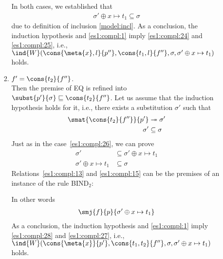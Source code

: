 \begin{enumerate}
\begin{enumerate}
\begin{enumerate}
\begin{itemize}
            \end{itemize}
            In both cases, we established that
            \begin{gather}
              \sigma' \oplus x \mapsto t_1 \subseteq
              \sigma \label{es1:compl:25}
            \end{gather}
            due to definition of inclusion \eqref{model:incl}. As a
            conclusion, the induction hypothesis and
            \eqref{es1:compl:1} imply \eqref{es1:compl:24} and
            \eqref{es1:compl:25}, i.e.,
            \(\ind{W}(\cons{\meta{x},l}{{p}''},
            \cons{t_1,l}{f''}, \sigma, \sigma' \oplus x \mapsto t_1)\)
            holds.

          \item \(f' = \cons{t_2}{f''}\).\\ Then the premise of
            \textsf{EQ} is refined into
            \(\subst{{p}'}{\sigma} \sqsubseteq
            \cons{t_2}{f''}\). Let us assume that the induction
            hypothesis holds for it, i.e., there exists a substitution
            \(\sigma'\) such that
            \begin{align}
              \smat{\cons{t_2}{f''}}{{p}'} &\twoheadrightarrow
              \sigma' \label{es1:compl:13}\\
              \sigma' &\subseteq \sigma\notag
            \end{align}
            Just as in the case~\ref{es1:compl:26}, we can prove
            \begin{align}
              \sigma' &\subseteq \sigma' \oplus x \mapsto t_1
              \label{es1:compl:15}\\
              \sigma' \oplus x \mapsto t_1 &\subseteq \sigma
              \label{es1:compl:27}
            \end{align}
            Relations~\eqref{es1:compl:13} and \eqref{es1:compl:15}
            can be the premises of an instance of the rule
            \textsf{BIND}\(_2\):
            In other words
            \begin{gather}
              \smj{f}{{p}}{\sigma' \oplus x \mapsto
                t_1} \label{es1:compl:28}
            \end{gather}
            As a conclusion, the induction hypothesis and
            \eqref{es1:compl:1} imply \eqref{es1:compl:28} and
            \eqref{es1:compl:27}, i.e.,
            \(\ind{W}(\cons{\meta{x}}{{p}'},
            \cons{t_1,t_2}{f''}, \sigma, \sigma' \oplus x \mapsto
            t_1)\) holds.
        \end{enumerate}


\end{enumerate}
\end{enumerate}
